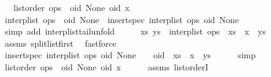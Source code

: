 \begin{isabellebody}
\ \ \ {\isachardoublequoteopen}list{\isacharunderscore}order\ {\isacharparenleft}ops\ {\isacharat}\ {\isacharbrackleft}{\isacharparenleft}oid{\isacharcomma}\ None{\isacharparenright}{\isacharbrackright}{\isacharparenright}\ oid\ x{\isachardoublequoteclose}\isanewline
%
\isadelimproof
%
\endisadelimproof
%
\isatagproof
{}\isamarkupfalse%
\ {\isacharminus}\isanewline
\ \ \isamarkupfalse%
\ {\isachardoublequoteopen}interp{\isacharunderscore}list\ {\isacharparenleft}ops\ {\isacharat}\ {\isacharbrackleft}{\isacharparenleft}oid{\isacharcomma}\ None{\isacharparenright}{\isacharbrackright}{\isacharparenright}\ {\isacharequal}\ insert{\isacharunderscore}spec\ {\isacharparenleft}interp{\isacharunderscore}list\ ops{\isacharparenright}\ {\isacharparenleft}oid{\isacharcomma}\ None{\isacharparenright}{\isachardoublequoteclose}\isanewline
\ \ \ \ \isamarkupfalse%
\ {\isacharparenleft}simp\ add{\isacharcolon}\ interp{\isacharunderscore}list{\isacharunderscore}tail{\isacharunderscore}unfold{\isacharparenright}\isanewline
\ \ \isamarkupfalse%
\ \isamarkupfalse%
\ xs\ ys\ \ {\isachardoublequoteopen}interp{\isacharunderscore}list\ ops\ {\isacharequal}\ xs\ {\isacharat}\ {\isacharbrackleft}x{\isacharbrackright}\ {\isacharat}\ ys{\isachardoublequoteclose}\isanewline
\ \ \ \ \isamarkupfalse%
\ assms{\isacharparenleft}{}{\isacharparenright}\ split{\isacharunderscore}list{\isacharunderscore}first\ \isamarkupfalse%
\ fastforce\isanewline
\ \ \isamarkupfalse%
\ {\isachardoublequoteopen}insert{\isacharunderscore}spec\ {\isacharparenleft}interp{\isacharunderscore}list\ ops{\isacharparenright}\ {\isacharparenleft}oid{\isacharcomma}\ None{\isacharparenright}\ {\isacharequal}\ {\isacharbrackleft}{\isacharbrackright}\ {\isacharat}\ {\isacharbrackleft}oid{\isacharbrackright}\ {\isacharat}\ xs\ {\isacharat}\ {\isacharbrackleft}x{\isacharbrackright}\ {\isacharat}\ ys{\isachardoublequoteclose}\isanewline
\ \ \ \ \isamarkupfalse%
\ simp\isanewline
\ \ \isamarkupfalse%
\ \isamarkupfalse%
\ {\isachardoublequoteopen}list{\isacharunderscore}order\ {\isacharparenleft}ops\ {\isacharat}\ {\isacharbrackleft}{\isacharparenleft}oid{\isacharcomma}\ None{\isacharparenright}{\isacharbrackright}{\isacharparenright}\ oid\ x{\isachardoublequoteclose}\isanewline
\ \ \ \ \isamarkupfalse%
\ assms{\isacharparenleft}{}{\isacharparenright}\ list{\isacharunderscore}orderI\ \isamarkupfalse%

\end{isabellebody}
